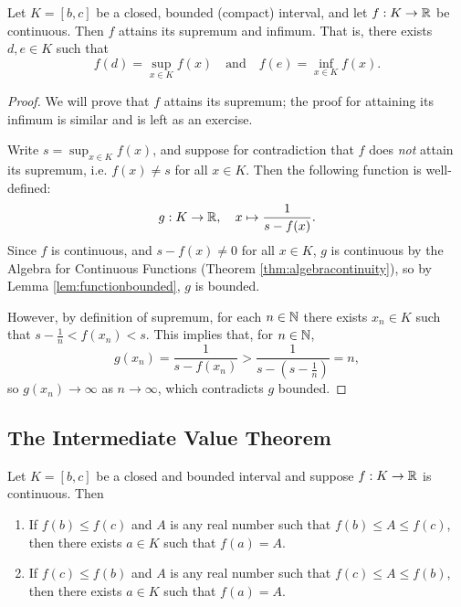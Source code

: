 \documentclass[../analysis1.tex]{subfiles}
\begin{document}
\begin{theorem}
\label{thm:evt}
    \begin{shaded*}
        Let $K = [b,c]$ be a closed, bounded (compact) interval, and let $f: K \to \mathbb{R}$ be continuous. Then $f$ attains its supremum and infimum. That is, there exists $d,e \in K$ such that
        \[f(d)=\sup_{x\in K}f(x)\quad\text{and}\quad f(e)=\inf_{x\in K}f(x).\]
    \end{shaded*}
\end{theorem}
\begin{proof}
    We will prove that $f$ attains its supremum; the proof for attaining its infimum is similar and is left as an exercise.\par
    Write $s=\sup_{x\in K}f(x)$, and suppose for contradiction that $f$ does \textit{not} attain its supremum, i.e. $f(x)\ne s$ for all $x\in K$. Then the following function is well-defined:
    \[g:K\to\mathbb{R},\quad x\mapsto \frac{1}{s-f(x)}.\]
    Since $f$ is continuous, and $s-f(x)\ne 0$ for all $x\in K$, $g$ is continuous by the Algebra for Continuous Functions (Theorem \ref{thm:algebracontinuity}), so by Lemma \ref{lem:functionbounded}, $g$ is bounded.\par
    However, by definition of supremum, for each $n\in\mathbb{N}$ there exists $x_n\in K$ such that $s-\frac{1}{n}<f(x_n)<s$. This implies that, for $n\in\mathbb{N}$, \[g(x_n)=\frac{1}{s-f(x_n)}>\frac{1}{s-\left(s-\frac{1}{n}\right)}=n,\] so $g(x_n)\to\infty$ as $n\to\infty$, which contradicts $g$ bounded.\qedhere
\end{proof}


\subsection{The Intermediate Value Theorem}

\begin{theorem}
\label{thm:ivt}
    \begin{shaded*}
        Let $K=[b,c]$ be a closed and bounded interval and suppose $f:K\to \mathbb{R}$ is continuous. Then
        \begin{enumerate}
            \item[1.] If $f(b)\le f(c)$ and $A$ is any real number such that $f(b)\le A\le f(c)$, then there exists $a\in K$ such that $f(a)=A$.
            \item[2.] If $f(c)\le f(b)$ and $A$ is any real number such that $f(c)\le A\le f(b)$, then there exists $a\in K$ such that $f(a)=A$. 
        \end{enumerate}
    \end{shaded*}
\end{theorem}
\end{document}
